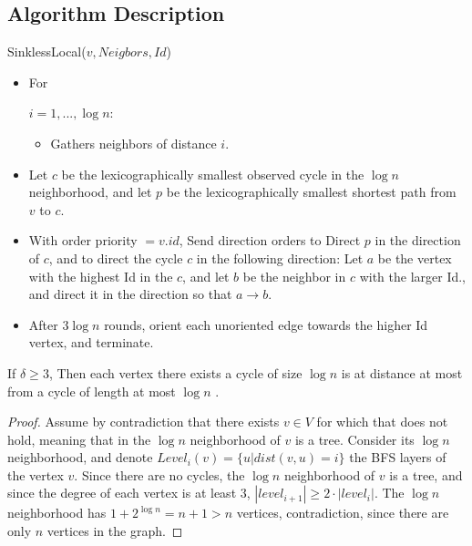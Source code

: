 \subsection{Algorithm Description}
\begin{algorithm}[H]\label{SinklessLocal}\small
\caption{\small SinklessLocal($v,Neigbors,Id$)}
\begin{itemize}
\item\begin{bf}For\end{bf} {$i=1,...,\log{n}$}:
\begin{itemize}
\item Gathers neighbors of distance $i$.   
\end{itemize}
\item Let $c$ be the lexicographically smallest observed cycle in the $\log{n}$ neighborhood, and let $p$ be the lexicographically smallest shortest path from $v$ to $c$.
\item With order priority $=v.id$, Send direction orders to Direct $p$ in the direction of $c$, and to direct the cycle $c$ in the following direction: Let $a$ be the vertex with the highest Id in the $c$, and let $b$ be the neighbor in $c$ with the larger Id., and direct it in the direction so that $a \rightarrow b$.
\item After $3\log{n}$ rounds, orient each unoriented edge towards the higher Id vertex, and terminate.
\end{itemize}
\end{algorithm}


\begin{lemma}
	\label{lem:near_cycle}
If $\delta \geq 3$, Then each vertex there exists a cycle of size $\log{n}$ is at distance at most  from a cycle of length at most $\log{n}$ .
\end{lemma}
\begin{proof}
Assume by contradiction that there exists $v \in V$ for which that does not hold, meaning that in the $\log{n}$ neighborhood of $v$ is a tree. Consider its $\log{n}$ neighborhood, and denote $Level_i(v) = \{u|dist(v,u) = i\}$ the BFS layers of the vertex $v$. Since there are no cycles, the $\log{n}$ neighborhood of $v$ is a tree, and since the degree of each vertex is at least $3$, $|level_{i+1}| \geq 2 \cdot |level_i|$. The $\log{n}$ neighborhood has $1+2^{\log{n}} = n+1 > n$ vertices, contradiction, since there are only $n$ vertices in the graph.
\end{proof}


